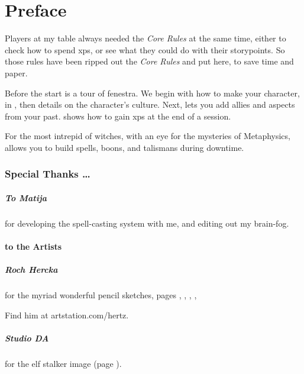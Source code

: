 \chapter{Preface}

\begin{multicols}{2}

\noindent
Players at my table always needed the \textit{Core Rules} at the same time, either to check how to spend \glspl{xp}, or see what they could do with their \glspl{storypoint}.
So those rules have been ripped out the \textit{Core Rules} and put here, to save time and paper.

Before the start is a tour of \gls{fenestra}.
We begin with how to make your character, in , then details on the character's culture.
Next,  lets you add allies and aspects from your past.
 shows how to gain \glspl{xp} at the end of a session.

For the most intrepid of witches, with an eye for the mysteries of Metaphysics,  allows you to build spells, \glspl{boon}, and \glspl{talisman} during \gls{downtime}.

\subsection*{Special Thanks \ldots}

\paragraph{To Matija}
for developing the spell-casting system with me, and editing out my brain-fog.

\subsubsection*{to the Artists}

\paragraph{Roch Hercka} for the myriad wonderful pencil sketches, pages 
\pageref{Roch_Hercka/five_races}, 
\pageref{Roch_Hercka/illusion_trogdor}, 
\pageref{Roch_Hercka/xp-1}, 
\pageref{Roch_Hercka/xp-2}, 

Find him at artstation.com/hertz.

\paragraph{Studio DA}
for the elf stalker image
(page \pageref{Studio_DA/elf_stalker}).


\end{multicols}
